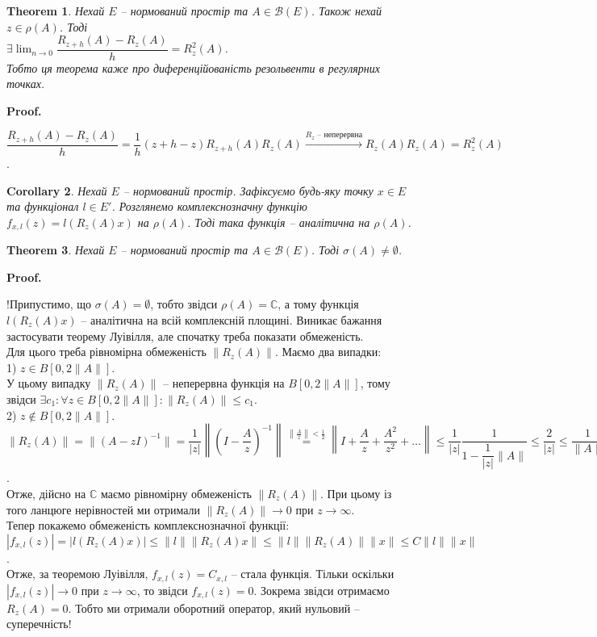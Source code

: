 \documentclass[a4paper, 10pt]{article}
\makeatletter
\theoremstyle{theoremdd}
\newtheorem{theorem}{Theorem}[subsection]
\theoremstyle{theoremdd}
\theoremstyle{theoremdd}
\theoremstyle{theoremdd}
\theoremstyle{theoremdd}
\theoremstyle{theoremdd}
\theoremstyle{theoremdd}
\theoremstyle{theoremdd}
\newtheorem{corollary}[theorem]{Corollary}
\renewenvironment{proof}[1][Proof.\\]{\par
\pushQED{\hfill \qed}%
\normalfont \topsep6\p@\@plus6\p@\relax
\trivlist
\item\relax
{\bfseries
#1\@addpunct{.}}\hspace\labelsep\ignorespaces
}{%
\popQED\endtrivlist\@endpefalse
}
\makeatother
\begin{document}
\begin{theorem}
Нехай $E$ -- нормований простір та $A \in \mathcal{B}(E)$. Також нехай $z \in \rho(A)$. Тоді\\
$\exists \displaystyle\lim_{n \to 0} \dfrac{R_{z+h}(A) - R_z(A)}{h} = R_z^2(A)$.\\
Тобто ця теорема каже про диференційованість резольвенти в регулярних точках.
\end{theorem}

\begin{proof}
$\dfrac{R_{z+h}(A) - R_z(A)}{h} = \dfrac{1}{h} (z+h-z) R_{z+h}(A) R_z(A) \overset{R_z \text{ -- неперервна}}{\to} R_z(A) R_z(A) = R_z^2(A)$.
\end{proof}

\begin{corollary}
Нехай $E$ -- нормований простір. Зафіксуємо будь-яку точку $x \in E$ та функціонал $l \in E'$. Розглянемо комплекснозначну функцію $f_{x,l}(z) = l(R_z(A)x)$ на $\rho(A)$. Тоді така функція -- аналітична на $\rho(A)$.
\end{corollary}

\begin{theorem}
Нехай $E$ -- нормований простір та $A \in \mathcal{B}(E)$. Тоді $\sigma(A) \neq \emptyset$.
\end{theorem}

\begin{proof}
!Припустимо, що $\sigma(A) = \emptyset$, тобто звідси $\rho(A) = \mathbb{C}$, а тому функція $l(R_z(A)x)$ -- аналітична на всій комплексній площині. Виникає бажання застосувати теорему Луівілля, але спочатку треба показати обмеженість.\\
Для цього треба рівномірна обмеженість $\|R_z(A)\|$. Маємо два випадки:\\
1) $z \in B[0, 2\|A\|]$.\\
У цьому випадку $\|R_z(A)\|$ -- неперервна функція на $B[0, 2\|A\|]$, тому звідси $\exists c_1: \forall z \in B[0,2\|A\|]: \|R_z(A)\| \leq c_1$.
\bigskip \\
2) $z \notin B[0, 2\|A\|]$.\\
$\|R_z(A)\| = \|(A-zI)^{-1}\| = \dfrac{1}{|z|} \left\|  \left(I - \dfrac{A}{z}\right)^{-1} \right\| \overset{\left\| \frac{A}{z}\right\| < \frac{1}{2}}{=} \left\| I + \dfrac{A}{z} + \dfrac{A^2}{z^2} + \dots \right\| \leq \dfrac{1}{|z|} \dfrac{1}{1 - \dfrac{1}{|z|} \|A\|} \leq \dfrac{2}{|z|} \leq \dfrac{1}{\|A\|}$.\\
Отже, дійсно на $\mathbb{C}$ маємо рівномірну обмеженість $\|R_z(A)\|$. При цьому із того ланцюге нерівностей ми отримали $\|R_z(A)\| \to 0$ при $z \to \infty$.\\
Тепер покажемо обмеженість комплекснозначної функції:\\
$|f_{x,l}(z)| = |l(R_z(A)x)| \leq \|l\| \| R_z(A)x\| \leq \|l\| \|R_z(A) \| \|x\| \leq C \|l\| \|x\|$.\\
Отже, за теоремою Луівілля, $f_{x,l}(z) = C_{x,l}$ -- стала функція. Тільки оскільки $|f_{x,l}(z)| \to 0$ при $z \to \infty$, то звідси $f_{x,l}(z) = 0$. Зокрема звідси отримаємо $R_z(A) = 0$. Тобто ми отримали оборотний оператор, який нульовий -- суперечність!
\end{proof}
\end{document}
